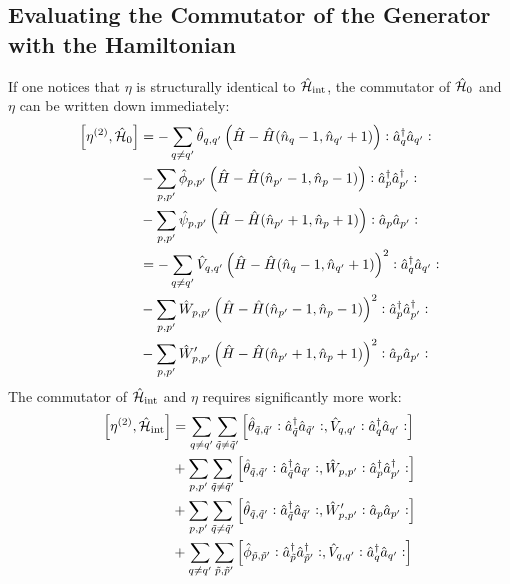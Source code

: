 \begin{appendix}
\subsection{Evaluating the Commutator of the Generator with the Hamiltonian}
If one notices that $\eta$ is structurally identical to $\hat{\mathcal{H}}_{\mathrm{int}}$, the commutator of $\hat{\mathcal{H}}_0$ and $\eta$ can be written down immediately:
\begin{align}
\left[\eta^{(2)},\hat{\mathcal{H}}_0\right] &= -\sum\limits_{q\neq q^\prime}\hat \theta_{q,q^\prime} \left(\hat H - \hat H(\hat n_q-1,\hat n_{q^\prime}+1)\right) \vcentcolon \hat a^\dagger_q\hat a_{q^\prime}\vcentcolon \\
&-\sum\limits_{p,p^\prime}\hat \phi_{p,p^\prime}\left(\hat H-\hat H(\hat n_{p^\prime}-1,\hat n_p -1)\right)\vcentcolon \hat a^\dagger_p\hat a^\dagger_{p^\prime}\vcentcolon\nonumber\\
&- \sum\limits_{p,p^\prime}\hat \psi_{p,p^\prime}\left(\hat H-\hat H(\hat n_{p^\prime}+1,\hat n_p +1)\right)\vcentcolon \hat a_p\hat a_{p^\prime}\vcentcolon\nonumber\\
&= - \sum\limits_{q\neq q^\prime}\hat V_{q,q^\prime} \left(\hat H - \hat H(\hat n_q-1,\hat n_{q^\prime}+1)\right)^2 \vcentcolon \hat a^\dagger_q\hat a_{q^\prime}\vcentcolon \\
&-\sum\limits_{p,p^\prime}\hat W_{p,p^\prime}\left(\hat H-\hat H(\hat n_{p^\prime}-1,\hat n_p -1)\right)^2\vcentcolon \hat a^\dagger_p\hat a^\dagger_{p^\prime}\vcentcolon\nonumber\\
&- \sum\limits_{p,p^\prime}\hat W_{p,p^\prime}^\prime\left(\hat H-\hat H(\hat n_{p^\prime}+1,\hat n_p +1)\right)^2\vcentcolon \hat a_p\hat a_{p^\prime}\vcentcolon\nonumber
\end{align}
The commutator of $\hat{\mathcal{H}}_{\mathrm{int}}$ and $\eta$ requires significantly more work:
\begin{subequations}
\begin{align}
\left[\eta^{(2)},\ham_{\mathrm{int}}\right] &= \Sum_{q\neq q^\prime}\Sum_{\tilde q\neq\tilde q^\prime} \left[\hat\theta_{\tilde q,\tilde q^\prime}\NO\CR_{\tilde q}\AN_{\tilde q^\prime}\NO,\hat V_{q,q^\prime}\NO\CR_q\AN_{q^\prime}\NO\right] \label{com_eta_Hint_A} \\
&+ \Sum_{p, p^\prime}\Sum_{\tilde q\neq\tilde q^\prime} \left[\hat\theta_{\tilde q,\tilde q^\prime}\NO\CR_{\tilde q}\AN_{\tilde q^\prime}\NO,\hat W_{p,p^\prime}\NO\CR_p\CR_{p^\prime}\NO\right] \label{com_eta_Hint_B} \\
&+ \Sum_{p, p^\prime}\Sum_{\tilde q\neq\tilde q^\prime} \left[\hat\theta_{\tilde q,\tilde q^\prime}\NO\CR_{\tilde q}\AN_{\tilde q^\prime}\NO,\hat W_{p,p^\prime}^\prime\NO\AN_p\AN_{p^\prime}\NO\right] \label{com_eta_Hint_C} \\
&+ \Sum_{q\neq q^\prime}\Sum_{\tilde p,\tilde p^\prime} \left[\hat\phi_{\tilde p,\tilde p^\prime}\NO\CR_{\tilde p}\CR_{\tilde p^\prime}\NO,\hat V_{q,q^\prime}\NO\CR_q\AN_{q^\prime}\NO\right] \label{com_eta_Hint_D} \\

\end{align}
\end{subequations}
\end{appendix}
